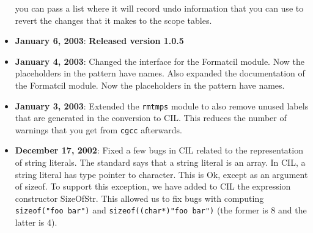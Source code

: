 \documentclass{article}
\def\t#1{{\tt #1}}
\begin{document}
\begin{itemize}
you can pass a list where it will record undo information that you can use to
revert the changes that it makes to the scope tables.
\item {\bf January 6, 2003}: {\bf Released version 1.0.5}
\item {\bf January 4, 2003}: Changed the interface for the Formatcil module.
  Now the placeholders in the pattern have names. Also expanded the
  documentation of the Formatcil module.
  Now the placeholders in the pattern have names.
\item {\bf January 3, 2003}: Extended the \t{rmtmps} module to also remove
  unused labels that are generated in the conversion to CIL. This reduces the
  number of warnings that you get from \t{cgcc} afterwards.
\item {\bf December 17, 2002}: Fixed a few bugs in CIL related to the
  representation of string literals. The standard says that a string literal
  is an array. In CIL, a string literal has type pointer to character. This is
  Ok, except as an argument of sizeof. To support this exception, we have
  added to CIL the expression constructor SizeOfStr. This allowed us to fix
  bugs with computing \t{sizeof("foo bar")} and \t{sizeof((char*)"foo bar")}
  (the former is 8 and the latter is 4).


\end{itemize}
\end{document}
